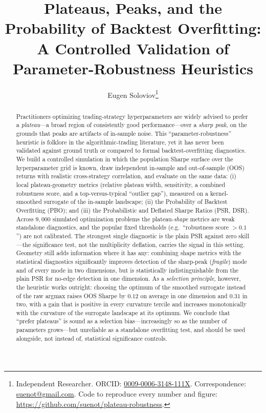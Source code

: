 \documentclass[11pt]{article}
\title{\bfseries Plateaus, Peaks, and the Probability of Backtest Overfitting:\\
A Controlled Validation of Parameter-Robustness Heuristics}
\author{Eugen Soloviov\thanks{Independent Researcher. ORCID:
\href{https://orcid.org/0009-0006-3148-111X}{0009-0006-3148-111X}.
Correspondence: \href{mailto:suenot@gmail.com}{suenot@gmail.com}.
Code to reproduce every number and figure:
\url{https://github.com/suenot/plateau-robustness}.}}
\date{}
\begin{document}
\maketitle

\begin{abstract}
Practitioners optimizing trading-strategy hyperparameters are widely advised to
prefer a \emph{plateau}---a broad region of consistently good performance---over
a \emph{sharp peak}, on the grounds that peaks are artifacts of in-sample noise.
This ``parameter-robustness'' heuristic is folklore in the algorithmic-trading
literature, yet it has never been validated against ground truth or compared to
formal backtest-overfitting diagnostics. We build a controlled simulation in
which the population Sharpe surface over the hyperparameter grid is known, draw
independent in-sample and out-of-sample (OOS) returns with realistic
cross-strategy correlation, and evaluate on the same data: (i) local
plateau-geometry metrics (relative plateau width, sensitivity, a combined
robustness score, and a top-versus-typical ``outlier gap''), measured on a
kernel-smoothed surrogate of the in-sample landscape; (ii) the Probability of
Backtest Overfitting (PBO); and (iii) the Probabilistic and Deflated Sharpe
Ratios (PSR, DSR). Across $9{,}000$ simulated optimization problems the
plateau-\emph{shape} metrics are weak standalone diagnostics, and the popular
fixed thresholds (e.g.\ ``robustness score $>0.1$'') are not calibrated. The
strongest single diagnostic is the plain PSR against zero skill---the
significance test, not the multiplicity deflation, carries the signal in this
setting. Geometry still adds information where it has any: combining shape
metrics with the statistical diagnostics significantly improves detection of
the sharp-peak (\emph{fragile}) mode and of every mode in two dimensions, but
is statistically indistinguishable from the plain PSR for no-edge detection in
one dimension. As a \emph{selection principle}, however, the heuristic works
outright: choosing the optimum of the smoothed surrogate instead of the raw
argmax raises OOS Sharpe by $0.12$ on average in one dimension and $0.31$ in
two, with a gain that is positive in every curvature tercile and increases
monotonically with the curvature of the surrogate landscape at its optimum. We
conclude that ``prefer plateaus'' is sound as a selection bias---increasingly so
as the number of parameters grows---but unreliable as a standalone overfitting
test, and should be used alongside, not instead of, statistical significance
controls.
\end{abstract}
\end{document}
